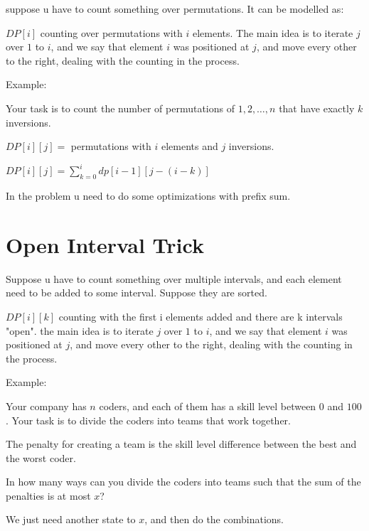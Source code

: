     suppose u have to count something over permutations. It can be modelled as:

    $DP[i]$ counting over permutations with $i$ elements.
    The main idea is to iterate $j$ over $1$ to $i$, and we say that element $i$ was positioned at $j$, and move every other to the right, dealing with the counting in the process.

    Example: 
    
    Your task is to count the number of permutations of $1,2, \ldots ,n$ that have exactly $k$ inversions.

    $DP[i][j] =$ permutations with $i$ elements and $j$ inversions.
        
    $DP[i][j] =  \sum_{k = 0}^{i} dp[i-1][j-(i-k)]$

    In the problem u need to do some optimizations with prefix sum.

    

    \section{Open Interval Trick}

    Suppose u have to count something over multiple intervals, and each element need to be added to some interval.  Suppose they are sorted.

    $DP[i][k]$ counting with the first i elements added and there are k intervals "open".
    the main idea is to iterate $j$ over $1$ to $i$, and we say that element $i$ was positioned at $j$, and move every other to the right, dealing with the counting in the process.

    Example: 
    
    Your company has $n$ coders, and each of them has a skill level between $0$ and $100$. Your task is to divide the coders into teams that work together.

    The penalty for creating a team is the skill level difference between the best and the worst coder.

    In how many ways can you divide the coders into teams such that the sum of the penalties is at most $x$?

    We just need another state to $x$, and then do the combinations.

    


